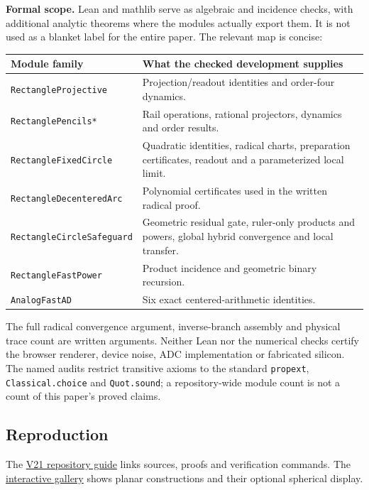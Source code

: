 \documentclass[11pt,a4paper]{article}
\begin{document}
\textbf{Formal scope.} Lean and mathlib \cite{lean4,mathlib} serve as algebraic and incidence checks, with additional analytic theorems where the modules actually export them. It is not used as a blanket label for the entire paper. The relevant map is concise:
\begin{center}\small
\begin{tabularx}{\linewidth}{@{}p{.34\linewidth}X@{}}\toprule
Module family & What the checked development supplies\\\midrule
\texttt{RectangleProjective} & Projection/readout identities and order-four dynamics.\\
\texttt{RectanglePencils*} & Rail operations, rational projectors, dynamics and order results.\\
\texttt{RectangleFixedCircle} & Quadratic identities, radical charts, preparation certificates, readout and a parameterized local limit.\\
\texttt{RectangleDecenteredArc} & Polynomial certificates used in the written radical proof.\\
\texttt{RectangleCircleSafeguard} & Geometric residual gate, ruler-only products and powers, global hybrid convergence and local transfer.\\
\texttt{RectangleFastPower} & Product incidence and geometric binary recursion.\\
\texttt{AnalogFastAD} & Six exact centered-arithmetic identities.\\\bottomrule
\end{tabularx}\end{center}
The full radical convergence argument, inverse-branch assembly and physical trace count are written arguments. Neither Lean nor the numerical checks certify the browser renderer, device noise, ADC implementation or fabricated silicon. The named audits restrict transitive axioms to the standard \texttt{propext}, \texttt{Classical.choice} and \texttt{Quot.sound}; a repository-wide module count is not a count of this paper's proved claims.

\clearpage
\subsection{Reproduction}
The \href{https://github.com/ivan-fr/pandrosion/blob/main/paper/reciprocal_geometry_v21/README.md}{V21 repository guide} links sources, proofs and verification commands. The \href{https://ivan-fr.github.io/pandrosion/}{interactive gallery} shows planar constructions and their optional spherical display.
\end{document}
